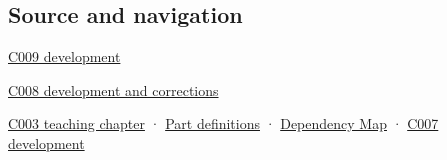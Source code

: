 \subsection{Source and navigation}\label{appendix-d52e4486f527-source-and-navigation}

\hyperref[appendix-fd090d982a15-m009---parts-127-147]{C009 development}

\hyperref[appendix-fd090d982a15-m008---parts-113-126]{C008 development and corrections}

\hyperref[01-foundations-i-ch002-where-the-bytes-live]{C003 teaching chapter} · \hyperref[appendix-fd090d982a15-m003---parts-41-60]{Part definitions} · \hyperref[appendix-4ad47bdd269a]{Dependency Map} · \hyperref[01-foundations-i-ch003-bringing-the-object-model-back-to-bytes]{C007 development}
